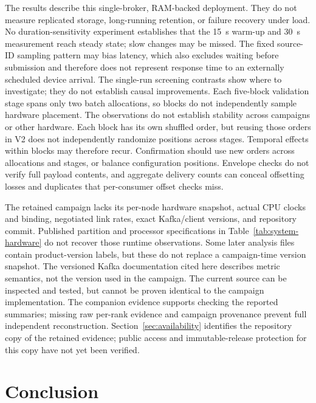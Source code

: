 \documentclass[10pt]{article}
\begin{document}
The results describe this single-broker, RAM-backed deployment.  They do not
measure replicated storage, long-running retention, or failure recovery under
load.  No duration-sensitivity experiment establishes that the 15~s warm-up
and 30~s measurement reach steady state; slow changes may be missed. The fixed
source-ID sampling pattern may bias latency, which also excludes waiting before
submission and therefore
does not represent response time to an externally scheduled device arrival.  The single-run
screening contrasts show where to investigate; they do not establish causal
improvements.  Each five-block validation stage spans only two batch allocations,
so blocks do not independently sample hardware placement.  The observations
do not establish stability across campaigns or other hardware. Each block has
its own shuffled order, but reusing those orders in V2 does not independently
randomize positions across stages. Temporal effects within blocks may therefore
recur. Confirmation should use new orders across allocations and stages, or
balance configuration positions. Envelope checks do
not verify full payload contents, and aggregate delivery counts can conceal
offsetting losses and duplicates that per-consumer offset checks miss.

The retained campaign lacks its per-node hardware snapshot, actual CPU clocks
and binding, negotiated link rates, exact Kafka/client versions, and repository
commit.  Published partition and processor specifications in
Table~\ref{tab:system-hardware} do not recover those runtime observations. Some later analysis
files contain product-version labels, but these do not replace a campaign-time
version snapshot.  The versioned Kafka documentation cited here describes
metric semantics, not the version used in the campaign.  The current source
can be inspected and tested, but cannot be proven identical to the campaign
implementation.  The companion evidence supports checking the reported
summaries; missing raw per-rank evidence and campaign provenance prevent full
independent reconstruction. Section~\ref{sec:availability} identifies the
repository copy of the retained evidence; public access and immutable-release
protection for this copy have not yet been verified.

\section{Conclusion}
\label{sec:conclusion}
\end{document}
